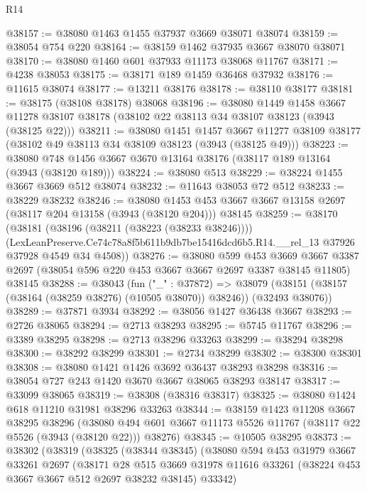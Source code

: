 \begin{lexlean}{R14}
\begin{coremodule}
@38157 := @38080 @1463 @1455 @37937 @3669 @38071 @38074
@38159 := @38054 @754 @220
@38164 := @38159 @1462 @37935 @3667 @38070 @38071
@38170 := @38080 @1460 @601 @37933 @11173 @38068 @11767
@38171 := @4238 @38053
@38175 := @38171 @189 @1459 @36468 @37932
@38176 := @11615 @38074
@38177 := @13211 @38176
@38178 := @38110 @38177
@38181 := @38175 (@38108 @38178) @38068
@38196 := @38080
    @1449
    @1458
    @3667
    @11278
    @38107
    @38178
    (@38102 @22 @38113 @34 @38107 @38123 (@3943 (@38125 @22)))
@38211 := @38080
    @1451
    @1457
    @3667
    @11277
    @38109
    @38177
    (@38102 @49 @38113 @34 @38109 @38123 (@3943 (@38125 @49)))
@38223 := @38080 @748 @1456 @3667 @3670 @13164 @38176 (@38117 @189 @13164 (@3943 (@38120 @189)))
@38224 := @38080 @513
@38229 := @38224 @1455 @3667 @3669 @512 @38074
@38232 := @11643 @38053 @72 @512
@38233 := @38229 @38232
@38246 := @38080
    @1453
    @453
    @3667
    @3667
    @13158
    @2697
    (@38117 @204 @13158 (@3943 (@38120 @204)))
    @38145
@38259 := @38170
    (@38181
      (@38196 (@38211 (@38223 (@38233 @38246))))
      (LexLeanPreserve.Ce74c78a8f5b611b9db7be15416dcd6b5.R14.__rel_13
        @37926
        @37928
        @4549
        @34
        @4508))
@38276 := @38080
    @599
    @453
    @3669
    @3667
    @3387
    @2697
    (@38054 @596 @220 @453 @3667 @3667 @2697 @3387 @38145 @11805)
    @38145
@38288 := @38043
    (fun ("_" : @37872) =>
    @38079 (@38151 (@38157 (@38164 (@38259 @38276) (@10505 @38070)) @38246)) (@32493 @38076))
@38289 := @37871 @3934
@38292 := @38056 @1427 @36438 @3667
@38293 := @2726 @38065
@38294 := @2713 @38293
@38295 := @5745 @11767
@38296 := @3389 @38295
@38298 := @2713 @38296 @33263
@38299 := @38294 @38298
@38300 := @38292 @38299
@38301 := @2734 @38299
@38302 := @38300 @38301
@38308 := @38080 @1421 @1426 @3692 @36437 @38293 @38298
@38316 := @38054 @727 @243 @1420 @3670 @3667 @38065 @38293 @38147
@38317 := @33099 @38065
@38319 := @38308 (@38316 @38317)
@38325 := @38080 @1424 @618 @11210 @31981 @38296 @33263
@38344 := @38159
    @1423
    @11208
    @3667
    @38295
    @38296
    (@38080 @494 @601 @3667 @11173 @5526 @11767 (@38117 @22 @5526 (@3943 (@38120 @22))) @38276)
@38345 := @10505 @38295
@38373 := @38302
    (@38319
      (@38325
        (@38344 @38345)
        (@38080
          @594
          @453
          @31979
          @3667
          @33261
          @2697
          (@38171
            @28
            @515
            @3669
            @31978
            @11616
            @33261
            (@38224 @453 @3667 @3667 @512 @2697 @38232 @38145)
            @33342)

\end{coremodule}
\end{lexlean}
